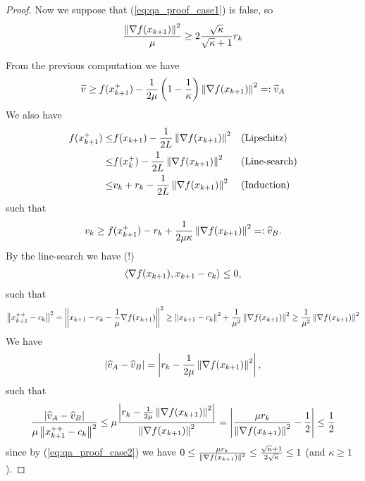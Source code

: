 \documentclass[12pt,english]{article}
\begin{document}
\begin{proof}
Now we suppose that (\ref{eq:qa_proof_case1}) is false, so
%
\begin{equation}\label{eq:qa_proof_case2}
\frac{\left\|\nabla f(x_{k+1})\right\|^2}{\mu} \ge  2\frac{\sqrt{\kappa}}{\sqrt{\kappa}+1}r_k
\end{equation}
%

From the previous computation we have
%
\begin{align*}
\widetilde{v}  \ge  f(x_{k+1}^+) - \frac{1}{2\mu}\left(1-\frac{1}{\kappa}\right)\left\|\nabla f(x_{k+1})\right\|^2=: \widetilde{v}_A
\end{align*}
%
We also have
%
\begin{align*}
f(x_{k+1}^+) \le& f(x_{k+1}) - \frac{1}{2L}\left\|\nabla f(x_{k+1})\right\|^2 && \mbox{(Lipschitz)}\\
\le& f(x_{k}^+) - \frac{1}{2L}\left\|\nabla f(x_{k+1})\right\|^2 && \mbox{(Line-search)}\\
\le&  v_{k} + r_{k} - \frac{1}{2L}\left\|\nabla f(x_{k+1})\right\|^2&& \mbox{(Induction)}
\end{align*}
such that
\begin{align*}
v_k \ge  f(x_{k+1}^+) -r_k + \frac{1}{2\mu\kappa}\left\|\nabla f(x_{k+1})\right\|^2=:\widehat{v}_B.
\end{align*}
%
By the line-search we have (!)
%
\begin{align*}
\langle\nabla f(x_{k+1}),x_{k+1}-c_k\rangle\le 0,
\end{align*}
%
such that 
%
\begin{align*}
\left\|x_{k+1}^{++}-c_k\right\|^2 = \left\|x_{k+1}-c_k -\frac{1}{\mu}\nabla f(x_{k+1})\right\|^2 \ge \left\|x_{k+1}-c_k\right\|^2 + \frac{1}{\mu^2}\left\|\nabla f(x_{k+1})\right\|^2
\ge \frac{1}{\mu^2}\left\|\nabla f(x_{k+1})\right\|^2
\end{align*}
%
We have
%
\begin{align*}
\left\vert{\widehat{v}_A-\widehat{v}_B}\right\vert = \left\vert{r_k - \frac{1}{2\mu}\left\|\nabla f(x_{k+1})\right\|^2}\right\vert,
\end{align*}
%
such that
%
\begin{align*}
\frac{\left\vert{\widehat{v}_A-\widehat{v}_B}\right\vert}{\mu\left\|x_{k+1}^{++}-c_k\right\|^2}\le \mu\frac{\left\vert{r_k - \frac{1}{2\mu}\left\|\nabla f(x_{k+1})\right\|^2}\right\vert}{\left\|\nabla f(x_{k+1})\right\|^2} = \left\vert{\frac{\mu r_k}{\left\|\nabla f(x_{k+1})\right\|^2}-\frac12}\right\vert\le \frac12
\end{align*}
%
since by (\ref{eq:qa_proof_case2}) we have $0\le\frac{\mu r_k}{\left\|\nabla f(x_{k+1})\right\|^2}\le \frac{\sqrt{\kappa}+1}{2\sqrt{\kappa}}\le1$ (and $\kappa\ge1$).


\end{proof}
\end{document}
